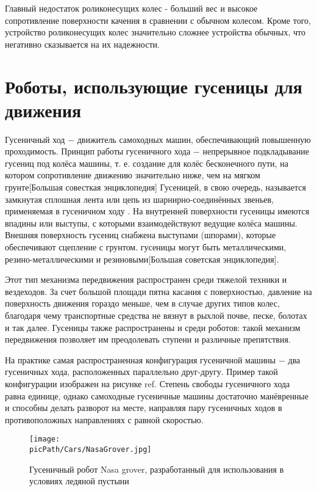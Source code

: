 \documentclass[oneside,final,14pt]{extreport}
\newcommand{\picPath}{img}
\begin{document}
Главный недостаток роликонесущих колес - больший вес и высокое сопротивление поверхности качения в сравнении с обычном колесом. Кроме того, устройство роликонесущих колес значительно сложнее устройства обычных, что негативно сказывается на их надежности.
\section{Роботы, использующие гусеницы для движения}
Гусеничный ход $-$ движитель самоходных машин, обеспечивающий повышенную проходимость. Принцип работы гусеничного хода $-$ непрерывное подкладывание гусениц под колёса машины, т. е. создание для колёс бесконечного пути, на котором сопротивление движению значительно ниже, чем на мягком грунте[Большая совесткая энциклопедия] Гусеницей, в свою очередь, называется замкнутая сплошная лента или цепь из шарнирно-соединённых звеньев, применяемая в гусеничном ходу . На внутренней поверхности гусеницы имеются впадины или выступы, с которыми взаимодействуют ведущие колёса машины. Внешняя поверхность гусениц снабжена выступами (шпорами), которые обеспечивают сцепление с грунтом. гусеницы могут быть металлическими, резино-металлическими и резиновыми[Большая советская энциклопедия].

Этот тип механизма передвижения распространен среди тяжелой техники и вездеходов. За счет большой площади пятна касания с поверхностью, давление на поверхность движения гораздо меньше, чем в случае других типов колес, благодаря чему транспортные средства не вязнут в рыхлой почве, песке, болотах и так далее. Гусеницы также распространены и среди роботов: такой механизм передвижения позволяет им преодолевать ступени и различные препятствия. 

На практике самая распространенная конфигурация гусеничной машины $-$ два гусеничных хода, расположенных параллельно друг-другу. Пример такой конфигурации изображен на рисунке ref. Степень свободы гусеничного хода равна единице, однако самоходные гусеничные машины достаточно манёвренные и  способны делать разворот на месте, направляя пару гусеничных ходов в противоположных направлениях с равной скоростью.

\begin{figure}[H]
\begin{center}
\texttt{[image: \\picPath/Cars/NasaGrover.jpg]}
\end{center}
  \caption{  Гусеничный робот Nasa grover, разработанный для использования в условиях ледяной пустыни }
  \label{Figure:NasaGrover}
\end{figure}
\end{document}
